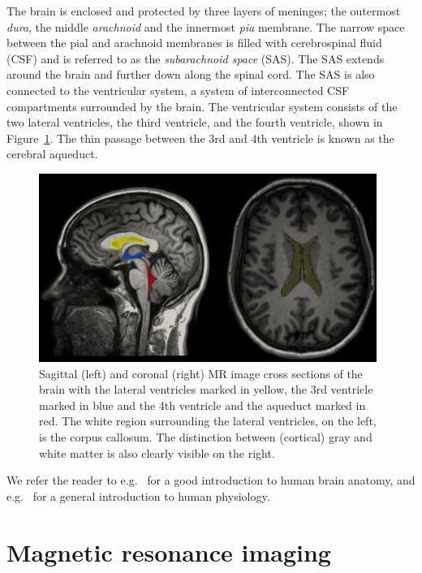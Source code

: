 The brain is enclosed and protected by three layers of
meninges; the outermost \emph{dura}, the middle
\emph{arachnoid} and the innermost \emph{pia} membrane. The
narrow space between the pial and arachnoid membranes is filled with
cerebrospinal fluid (CSF) and is referred to as the
\emph{subarachnoid space} (SAS). The SAS extends around the brain and
further down along the spinal cord. The SAS is also connected to the
ventricular system, a system of interconnected CSF compartments
surrounded by the brain. The ventricular system consists of the two
lateral ventricles, the third ventricle, and the fourth ventricle,
shown in Figure~\ref{fig:chp2:ventricles}. The thin passage between
the 3rd and 4th ventricle is known as the cerebral aqueduct.
\begin{figure}
  \centering
  \includegraphics[width=0.98\textwidth]{./chapters/chp2/FIG/exp-vent.png}
  \caption{Sagittal (left) and coronal (right) MR image cross sections
    of the brain with the lateral ventricles marked in yellow, the 3rd
    ventricle marked in blue and the 4th ventricle and the aqueduct
    marked in red. The white region surrounding the lateral
    ventricles, on the left, is the corpus callosum. The distinction
    between (cortical) gray and white matter is also clearly visible
    on the right.}
  \label{fig:chp2:ventricles}
\end{figure}

We refer the reader to e.g.~\cite{gray2009gray} for a good
introduction to human brain anatomy, and e.g.~\cite{boron2016medical}
for a general introduction to human physiology.

\section{Magnetic resonance imaging}

